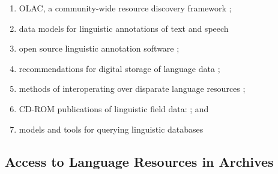 \renewcommand{\labelenumi}{(\alph{enumi})}
\begin{enumerate}\setlength{\itemsep}{0pt}
\item OLAC, a community-wide resource discovery framework
\citep{BirdSimons00,BirdSimons00survey,BirdSimons01,BirdSimons02workshop,Simons02query,BirdSimons03chum,SimonsBird03lht,Simons03display,SimonsBird03llc,BirdSimons04metadata};

\item data models for linguistic annotations of text and speech
\citep{BirdLiberman01,MaedaBird00,GraffBird00,CottonBird02,CieriBird01,ATLAS00,BirdHarrington01}

\item open source linguistic annotation software
\citep{Bird01acl,MaedaBird02,BirdMaeda02,MaLee02};

\item recommendations for digital storage of language data
\citep{BirdSimons03language,Simons06};

\item methods of interoperating over disparate language resources
\citep{SimonsEtal04text,SimonsEtal04lex};

\item CD-ROM publications of linguistic field data:
\citep{BirdBell01,Bird03ngomba,Bird03paradigms};
and

\item models and tools for querying linguistic databases
\citep{BirdBuneman01,BirdBunemanTan00,LaiBird04,Bird05planx,Bird06icde}
\end{enumerate}

\subsection{Access to Language Resources in Archives}


